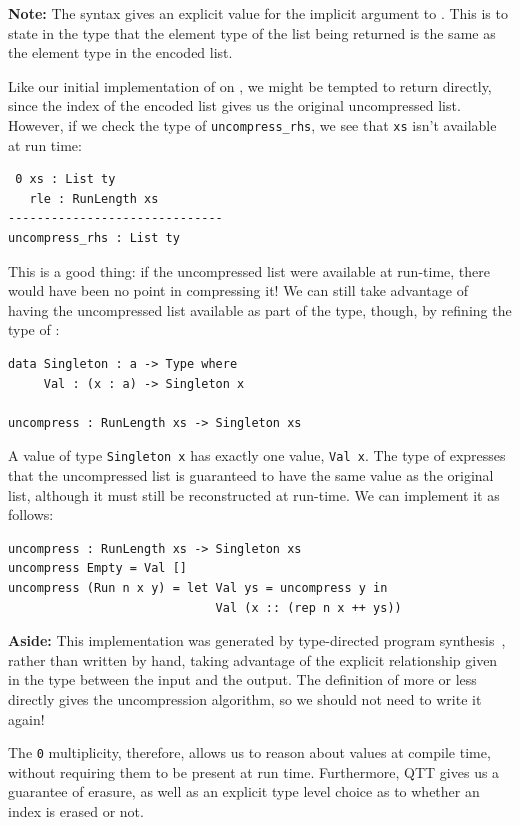 \textbf{Note:} The  syntax gives an explicit value for the implicit
argument to . This is to state in the type that the element type
of the list being returned is the same as the element type in the encoded
list.

Like our initial implementation of  on , we might be
tempted to return  directly, since the index of the encoded list gives
us the original uncompressed list. However, if we check the type of
\texttt{uncompress\_rhs}, we see that \texttt{xs} isn't available at run time:

\begin{lstlisting}
 0 xs : List ty
   rle : RunLength xs
------------------------------
uncompress_rhs : List ty
\end{lstlisting}

This is a good thing: if the uncompressed list were available at
run-time, there would have been no point in compressing it!
We can still take advantage of having the uncompressed list available
as part of the type, though, by refining the type of :

\begin{lstlisting}
data Singleton : a -> Type where
     Val : (x : a) -> Singleton x

uncompress : RunLength xs -> Singleton xs
\end{lstlisting}

A value of type \texttt{Singleton x} has exactly one value, \texttt{Val x}.
The type of  expresses that the uncompressed list
is guaranteed to have the same value as the original list, although it must
still be reconstructed at run-time. We can implement it as follows:

\begin{lstlisting}
uncompress : RunLength xs -> Singleton xs
uncompress Empty = Val []
uncompress (Run n x y) = let Val ys = uncompress y in
                             Val (x :: (rep n x ++ ys))
\end{lstlisting}

\textbf{Aside:} This implementation was generated by type-directed program
synthesis~\cite{polikarpova_program_2016}, rather than written by hand,
taking advantage of the explicit relationship given in the type between the
input and the output. The definition of  more or less directly
gives the uncompression algorithm, so we should not need to write it again!

The \texttt{0} multiplicity, therefore, allows us to reason about values
at compile time, without requiring them to be present at run time.
Furthermore, QTT gives us a guarantee of erasure, as well as an
explicit type level choice as to whether an index is erased or not.
